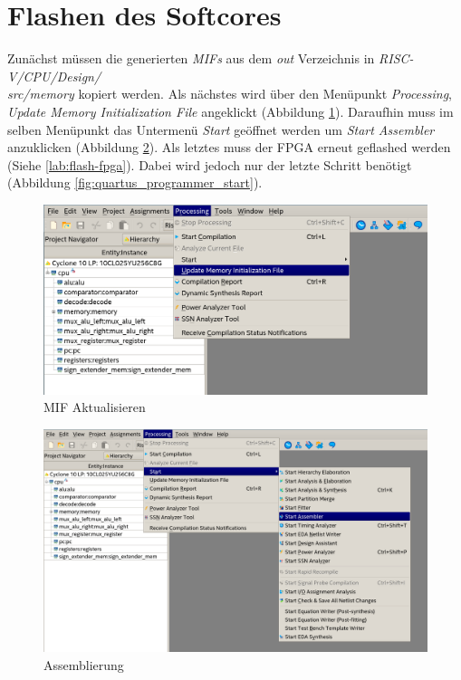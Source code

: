     \section{Flashen des Softcores}\label{lab:flash-softcore}

        Zunächst müssen die generierten \textit{MIFs} aus dem \textit{out} Verzeichnis in
        \textit{RISC-V/CPU/Design/\\src/memory} kopiert werden.
        Als nächstes wird über den Menüpunkt \textit{Processing},
        \textit{Update Memory Initialization File} angeklickt (Abbildung \ref{fig:update-mif}).
        Daraufhin muss im selben Menüpunkt das Untermenü \textit{Start} geöffnet werden um
        \textit{Start Assembler} anzuklicken (Abbildung \ref{fig:start-asm}).
        Als letztes muss der FPGA erneut geflashed werden (Siehe \ref{lab:flash-fpga}).
        Dabei wird jedoch nur der letzte Schritt benötigt (Abbildung \ref{fig:quartus_programmer_start}).


        \begin{figure}[H]
            \centering
            \includegraphics[scale=0.6]{img/update_mif.png}
            \caption{MIF Aktualisieren}
            \label{fig:update-mif}
        \end{figure}

        \begin{figure}[H]
            \centering
            \includegraphics[scale=0.5]{img/start_assembler.png}
            \caption{Assemblierung}
            \label{fig:start-asm}
        \end{figure}

